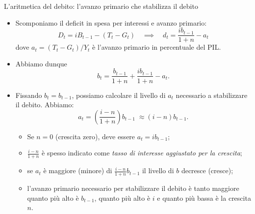 \documentclass[aspectratio=64,11pt]{beamer}
\begin{document}
\begin{frame}{L'aritmetica del debito: l'avanzo primario che stabilizza il debito}
  
  \begin{itemize}
  \item Scomponiamo il deficit in spesa per interessi e \alert{avanzo primario}:
    \begin{equation*}
      D_{t}=iB_{t-1}-(T_{t}-G_{t}) 
      \quad\implies\quad 
      d_{t}=\frac{ib_{t-1}}{1+n}-a_{t}
    \end{equation*}
    dove $a_{t}=(T_{t}-G_{t})/Y_{t}$ è l'avanzo primario in percentuale del PIL.
  \item Abbiamo dunque
    \begin{equation*}
      b_{t} = \frac{b_{t-1}}{1+n} + \frac{ib_{t-1}}{1+n} - a_{t}.
    \end{equation*}
  \item Fissando $b_{t}=b_{t-1}$, possiamo calcolare \alert{il livello di
      $a_{t}$ necessario a stabilizzare il debito}. Abbiamo:
    \begin{equation*}
      a_{t} = \left(\frac{i-n}{1+n}\right)b_{t-1} \; \approx (i-n)b_{t-1}.
    \end{equation*}
    \begin{itemize}
    \item Se $n=0$ (crescita zero), deve essere $a_{t}=ib_{t-1}$;
    \item $\frac{i-n}{1+n}$ è spesso indicato come \emph{tasso di interesse
        aggiustato per la crescita};
    \item se $a_t$ è maggiore (minore) di $\frac{i-n}{1+n}b_{t-1}$ il livello
      di $b$ decresce (cresce);
    \item l'avanzo primario necessario per stabilizzare il debito è tanto
      maggiore quanto più alto è $b_{t-1}$, quanto più alto è $i$ e quanto più
      bassa è la crescita $n$.
    \end{itemize}
  \end{itemize}
\end{frame}
\end{document}
